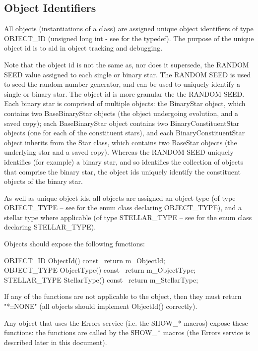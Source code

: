 \subsection{Object Identifiers}\label{sec:ObjectIdentifiers}

All objects (instantiations of a class) are assigned unique object identifiers of type OBJECT\_ID (unsigned long int - see  for the typedef).  The purpose of the unique object id is to aid in object tracking and debugging.

Note that the object id is not the same as, nor does it supersede, the RANDOM SEED value assigned to each single or binary star. The RANDOM SEED is used to seed the random number generator, and can be used to uniquely identify a single or binary star. The object id is more granular the the RANDOM SEED. Each binary star is comprised of multiple objects: the BinaryStar object, which contains two BaseBinaryStar objects (the object undergoing evolution, and a saved copy); each BaseBinaryStar object contains two BinaryConstituentStar objects (one for each of the constituent stars), and each BinaryConstituentStar object inherits from the Star class, which contains two BaseStar objects (the underlying star and a saved copy). Whereas the RANDOM SEED uniquely identifies (for example) a binary star, and so identifies the collection of objects that comprise the binary star, the object ids uniquely identify the constituent objects of the binary star.

As well as unique object ids, all objects are assigned an object type (of type OBJECT\_TYPE -- see  for the enum class declaring OBJECT\_TYPE), and a stellar type where applicable (of type STELLAR\_TYPE -- see  for the enum class declaring STELLAR\_TYPE).

Objects should expose the following functions:

\tabto{3em}OBJECT\_ID  ObjectId() const \lcb\ return m\_ObjectId;\ \rcb \\
\tabto{3em}OBJECT\_TYPE ObjectType() const \lcb\ return m\_ObjectType;\ \rcb \\
\tabto{3em}STELLAR\_TYPE StellarType() const \lcb\ return m\_StellarType;\ \rcb

If any of the functions are not applicable to the object, then they must return "*::NONE" (all objects should implement ObjectId() correctly).

Any object that uses the Errors service (i.e. the SHOW\_* macros) \textit{} expose these functions: the functions are called by the SHOW\_* macros (the Errors service is described later in this document).
